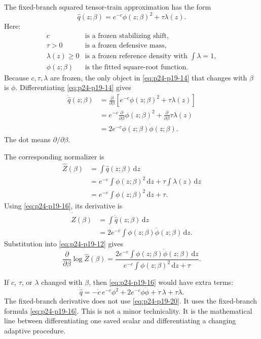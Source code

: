 \documentclass[11pt]{article}
\newcommand{\dd}{\,\mathrm d}
\begin{document}
The fixed-branch squared tensor-train approximation has the form
\[
    \widehat q(z;\beta)
    =
    e^{-c}\phi(z;\beta)^2+\tau\lambda(z).
    \label{eq:p24-p19-14}
\]
Here:
\[
\begin{array}{ll}
c & \text{is a frozen stabilizing shift},\\
\tau>0 & \text{is a frozen defensive mass},\\
\lambda(z)\ge0 & \text{is a frozen reference density with }\int\lambda=1,\\
\phi(z;\beta) & \text{is the fitted square-root function.}
\end{array}
\label{eq:p24-p19-15}
\]
Because \(c,\tau,\lambda\) are frozen, the only object in \eqref{eq:p24-p19-14} that changes
with \(\beta\) is \(\phi\).  Differentiating \eqref{eq:p24-p19-14} gives
\[
\begin{aligned}
    \dot{\widehat q}(z;\beta)
    &=
    \frac{\partial}{\partial\beta}
    \left[
    e^{-c}\phi(z;\beta)^2+\tau\lambda(z)
    \right]\\
    &=
    e^{-c}
    \frac{\partial}{\partial\beta}\phi(z;\beta)^2
    +
    \frac{\partial}{\partial\beta}\tau\lambda(z)\\
    &=
    2e^{-c}\phi(z;\beta)\dot\phi(z;\beta).
\end{aligned}
\label{eq:p24-p19-16}
\]
The dot means \(\partial/\partial\beta\).

The corresponding normalizer is
\[
\begin{aligned}
    \widehat Z(\beta)
    &=
    \int \widehat q(z;\beta)\dd z\\
    &=
    e^{-c}\int \phi(z;\beta)^2\dd z
    +
    \tau\int\lambda(z)\dd z\\
    &=
    e^{-c}\int \phi(z;\beta)^2\dd z+\tau.
\end{aligned}
\label{eq:p24-p19-17}
\]
Using \eqref{eq:p24-p19-16}, its derivative is
\[
\begin{aligned}
    \dot{\widehat Z}(\beta)
    &=
    \int \dot{\widehat q}(z;\beta)\dd z\\
    &=
    2e^{-c}
    \int \phi(z;\beta)\dot\phi(z;\beta)\dd z.
\end{aligned}
\label{eq:p24-p19-18}
\]
Substitution into \eqref{eq:p24-p19-12} gives
\[
    \frac{\partial}{\partial\beta}\log\widehat Z(\beta)
    =
    \frac{
    2e^{-c}\int \phi(z;\beta)\dot\phi(z;\beta)\dd z}
    {e^{-c}\int\phi(z;\beta)^2\dd z+\tau}.
    \label{eq:p24-p19-19}
\]

If \(c\), \(\tau\), or \(\lambda\) changed with \(\beta\), then \eqref{eq:p24-p19-16} would have
extra terms:
\[
    \dot{\widehat q}
    =
    -\dot c\,e^{-c}\phi^2
    +
    2e^{-c}\phi\dot\phi
    +
    \dot\tau\,\lambda
    +
    \tau\dot\lambda.
    \label{eq:p24-p19-20}
\]
The fixed-branch derivative does not use \eqref{eq:p24-p19-20}.  It uses the fixed-branch
formula \eqref{eq:p24-p19-16}.  This is not a minor technicality.  It is the mathematical line
between differentiating one saved scalar and differentiating a changing
adaptive procedure.
\end{document}

